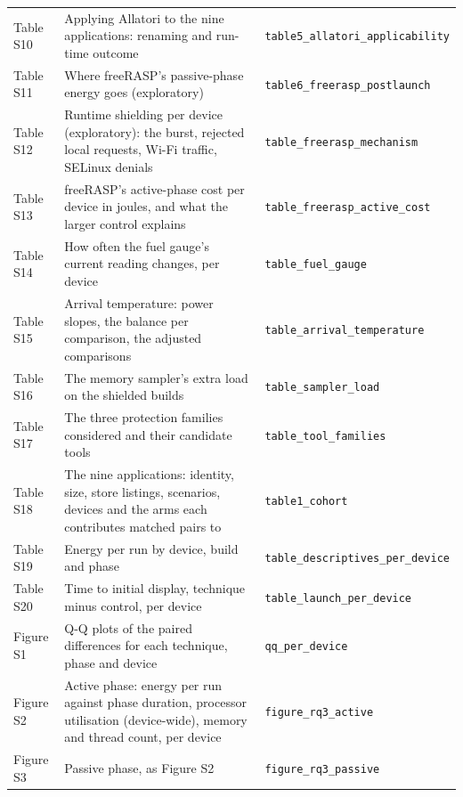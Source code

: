 \documentclass[10pt,a4paper]{article}
\begin{document}
\begin{center}
\begin{tabular}{lp{10cm}l}
Table S10 & Applying Allatori to the nine applications: renaming and run-time outcome & \texttt{\footnotesize table5\_allatori\_applicability} \\
Table S11 & Where freeRASP's passive-phase energy goes (exploratory) & \texttt{\footnotesize table6\_freerasp\_postlaunch} \\
Table S12 & Runtime shielding per device (exploratory): the burst, rejected local requests, Wi-Fi traffic, SELinux denials & \texttt{\footnotesize table\_freerasp\_mechanism} \\
Table S13 & freeRASP's active-phase cost per device in joules, and what the larger control explains & \texttt{\footnotesize table\_freerasp\_active\_cost} \\
Table S14 & How often the fuel gauge's current reading changes, per device & \texttt{\footnotesize table\_fuel\_gauge} \\
Table S15 & Arrival temperature: power slopes, the balance per comparison, the adjusted comparisons & \texttt{\footnotesize table\_arrival\_temperature} \\
Table S16 & The memory sampler's extra load on the shielded builds & \texttt{\footnotesize table\_sampler\_load} \\
Table S17 & The three protection families considered and their candidate tools & \texttt{\footnotesize table\_tool\_families} \\
Table S18 & The nine applications: identity, size, store listings, scenarios, devices and the arms each contributes matched pairs to & \texttt{\footnotesize table1\_cohort} \\
Table S19 & Energy per run by device, build and phase & \texttt{\footnotesize table\_descriptives\_per\_device} \\
Table S20 & Time to initial display, technique minus control, per device & \texttt{\footnotesize table\_launch\_per\_device} \\
Figure S1 & Q-Q plots of the paired differences for each technique, phase and device & \texttt{\footnotesize qq\_per\_device} \\
Figure S2 & Active phase: energy per run against phase duration, processor utilisation (device-wide), memory and thread count, per device & \texttt{\footnotesize figure\_rq3\_active} \\
Figure S3 & Passive phase, as Figure S2 & \texttt{\footnotesize figure\_rq3\_passive} \\
\bottomrule\end{tabular}\end{center}
\end{document}
